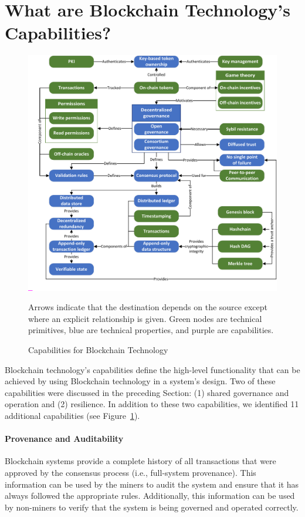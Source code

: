 \section{What are Blockchain Technology's Capabilities?}
\label{sec:capabilities}

\begin{figure}
	\centering
	\includegraphics[page=4,width=\columnwidth]{figures/grounded-theory-main}
	
	Arrows indicate that the destination depends on the source except where an explicit relationship is given. Green nodes are technical primitives, blue are technical properties, and purple are capabilities.
	\caption{Capabilities for Blockchain Technology}
	\label{fig:Capabilities}
\end{figure}

Blockchain technology's capabilities define the high-level functionality that can be achieved by using Blockchain technology in a system's design.
Two of these capabilities were discussed in the preceding Section: (1) shared governance and operation and (2) resilience.
In addition to these two capabilities, we identified 11 additional capabilities (see Figure~\ref{fig:Capabilities}).

\paragraph{Provenance and Auditability}
Blockchain systems provide a complete history of all transactions that were approved by the consensus process (i.e., full-system provenance).
This information can be used by the miners to audit the system and ensure that it has always followed the appropriate rules.
Additionally, this information can be used by non-miners to verify that the system is being governed and operated correctly.

